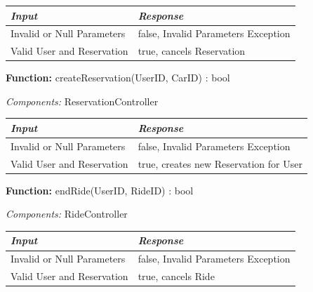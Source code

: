 \documentclass[a4paper]{article}
\begin{document}
\begin{center}
\begin{tabular}{ | L{6cm} | L{6cm} | }
\hline
	\textit{Input}& \textit{Response}\\ \hline
	Invalid or Null Parameters & false, Invalid Parameters Exception\\ \hline
	Valid User and Reservation& true, cancels Reservation\\ \hline
\end{tabular}
\end{center}
\textbf{Function:} createReservation(UserID, CarID) : bool \par
\textit{Components:} ReservationController
\begin{center}
\begin{tabular}{ | L{6cm} | L{6cm} | }
\hline
	\textit{Input}& \textit{Response}\\ \hline
	Invalid or Null Parameters & false, Invalid Parameters Exception\\ \hline
	Valid User and Reservation& true, creates new Reservation for User\\ \hline
\end{tabular}
\end{center}
\textbf{Function:} endRide(UserID, RideID) : bool \par
\textit{Components:} RideController
\begin{center}
\begin{tabular}{ | L{6cm} | L{6cm} | }
\hline
	\textit{Input}& \textit{Response}\\ \hline
	Invalid or Null Parameters & false, Invalid Parameters Exception\\ \hline
	Valid User and Reservation& true, cancels Ride\\ \hline
\end{tabular}
\end{center}
\end{document}
